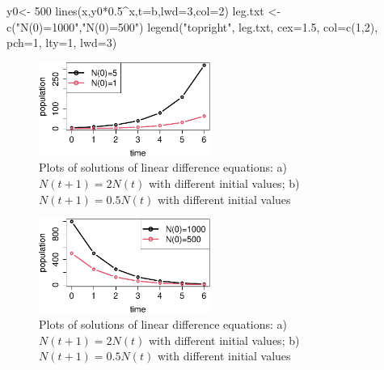 \documentclass[
  letterpaper,
  DIV=11,
  numbers=noendperiod]{scrreprt}
\newenvironment{Shaded}{\begin{snugshade}}{\end{snugshade}}
\newcommand{\AttributeTok}[1]{\textcolor[rgb]{0.40,0.45,0.13}{#1}}
\newcommand{\DecValTok}[1]{\textcolor[rgb]{0.68,0.00,0.00}{#1}}
\newcommand{\FloatTok}[1]{\textcolor[rgb]{0.68,0.00,0.00}{#1}}
\newcommand{\FunctionTok}[1]{\textcolor[rgb]{0.28,0.35,0.67}{#1}}
\newcommand{\NormalTok}[1]{\textcolor[rgb]{0.00,0.23,0.31}{#1}}
\newcommand{\OtherTok}[1]{\textcolor[rgb]{0.00,0.23,0.31}{#1}}
\newcommand{\SpecialCharTok}[1]{\textcolor[rgb]{0.37,0.37,0.37}{#1}}
\newcommand{\StringTok}[1]{\textcolor[rgb]{0.13,0.47,0.30}{#1}}
\begin{document}
\begin{Shaded}
\begin{Highlighting}[]
\NormalTok{y0}\OtherTok{\textless{}{-}} \DecValTok{500}
\FunctionTok{lines}\NormalTok{(x,y0}\SpecialCharTok{*}\FloatTok{0.5}\SpecialCharTok{\^{}}\NormalTok{x,}\AttributeTok{t=}\StringTok{\textquotesingle{}b\textquotesingle{}}\NormalTok{,}\AttributeTok{lwd=}\DecValTok{3}\NormalTok{,}\AttributeTok{col=}\DecValTok{2}\NormalTok{)}
\NormalTok{leg.txt }\OtherTok{\textless{}{-}} \FunctionTok{c}\NormalTok{(}\StringTok{"N(0)=1000"}\NormalTok{,}\StringTok{"N(0)=500"}\NormalTok{)}
\FunctionTok{legend}\NormalTok{(}\StringTok{"topright"}\NormalTok{, leg.txt, }\AttributeTok{cex=}\FloatTok{1.5}\NormalTok{, }\AttributeTok{col=}\FunctionTok{c}\NormalTok{(}\DecValTok{1}\NormalTok{,}\DecValTok{2}\NormalTok{), }\AttributeTok{pch=}\DecValTok{1}\NormalTok{, }\AttributeTok{lty=}\DecValTok{1}\NormalTok{, }\AttributeTok{lwd=}\DecValTok{3}\NormalTok{)}
\end{Highlighting}
\end{Shaded}

\begin{figure}[H]

{\centering \includegraphics[width=0.5\textwidth,height=\textheight]{./lindiff_files/figure-pdf/ch14-sol-1.pdf}

}

\caption{Plots of solutions of linear difference equations: a)
\(N(t+1) = 2N(t)\) with different initial values; b)
\(N(t+1) = 0.5N(t)\) with different initial values}

\end{figure}

\begin{figure}[H]

{\centering \includegraphics[width=0.5\textwidth,height=\textheight]{./lindiff_files/figure-pdf/ch14-sol-2.pdf}

}

\caption{Plots of solutions of linear difference equations: a)
\(N(t+1) = 2N(t)\) with different initial values; b)
\(N(t+1) = 0.5N(t)\) with different initial values}

\end{figure}
\end{document}
